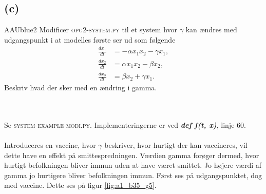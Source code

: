 \newpage
\subsection*{(c)}
%
\begin{color}{AAUblue2}
%
Modificer \textsc{opg2-system.py} til et system hvor $\gamma$ kan ændres med udgangspunkt i at modelles første ser ud som følgende 
\begin{align}
\frac{dx_1}{dt} &= - \alpha x_1 x_2 - \gamma x_1, \\
\frac{dx_2}{dt} & = \alpha x_1 x_2 - \beta x_2 , \\
\frac{dx_3}{dt} & = \beta x_2 + \gamma x_1.
\end{align}
%
Beskriv hvad der sker med en ændring i gamma.  
%
\end{color}
\\\\
% 
Se \textsc{system-example-modi.py}. Implementeringerne er ved
\textbf{\textit{def f(t, x)}}, linje $60$.
\\\\
%
Introduceres en vaccine, hvor $\gamma$ beskriver, hvor hurtigt der kan vaccineres, vil dette have en effekt på smittespredningen.
Værdien gamma forøger dermed, hvor hurtigt befolkningen bliver immun uden at have været smittet. Jo højere værdi af gamma jo hurtigere bliver befolkningen immun.
Først ses på udgangspunktet, dog med vaccine.
Dette ses på figur \ref{fig:a1_b35_g5}.
%
